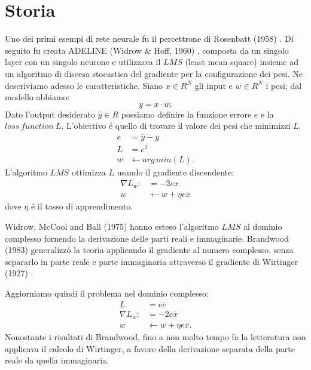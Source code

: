 \documentclass[a4paper,12pt]{report}
\begin{document}
 \section{Storia}
 Uno dei primi esempi di rete neurale fu il percettrone di Rosenbatt (1958) \cite{rosenblatt1958perceptron}. Di seguito fu creata ADELINE (Widrow \& Hoff, 1960) \cite{widrow1962generalization}, composta da un singolo layer con un singolo neurone e utilizzava il $LMS$ (least mean square) insieme ad un algoritmo di discesa stocastica del gradiente per la configurazione dei pesi. 
 Ne descriviamo adesso le caratteristiche. Siano $x \in R^N$ gli input e $w \in R^N$ i pesi; dal modello abbiamo:
 \begin{equation}
  y = x \cdot w.
 \end{equation}
 Dato l'output desiderato $\widehat{y} \in R$ possiamo definire la funzione errore $e$ e la $loss \ function \ L$. 
 L'obiettivo \'e quello di trovare il valore dei pesi che minimizzi $L$.
 \begin{align}
  e &= \widehat{y} - y\\
  L &= e^2\\
  w &\leftarrow arg \, min(L).
 \end{align}
 L'algoritmo $LMS$ ottimizza $L$ usando il gradiente discendente:
 \begin{align}
  \nabla L_w: &= -2ex\\
  w &\leftarrow w + \eta ex
 \end{align}
 dove $\eta$ \'e il tasso di apprendimento. 

 Widrow, McCool and Ball (1975) \cite{widrow1975complex} hanno esteso l'algoritmo $LMS$ al dominio complesso fornendo la derivazione delle parti reali e immaginarie. 
 Brandwood (1983) \cite{brandwood1983complex} generalizz\'o la teoria applicando il gradiente al numero complesso, senza separarlo in parte reale e parte immaginaria attraverso il gradiente di Wirtinger (1927) \cite{wirtinger1927formalen}. 

 Aggiorniamo quindi il problema nel dominio complesso:
 \begin{align}
  L &= e \overline{e}\\
  \nabla L_w : &= -2e\overline{x}\\
  w &\leftarrow w + \eta e \overline{x}.
 \end{align}
 Nonostante i risultati di Brandwood, fino a non molto tempo fa la letteratura non applicava il calcolo di Wirtinger, a favore della derivazione separata della parte reale da quella immaginaria. 
 
\end{document}
